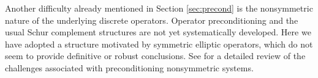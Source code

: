 \documentclass[11pt, reqno, a4paper, twoside]{article}
\numberwithin{equation}{section}
\numberwithin{remark}{section}
\numberwithin{figure}{section}
\numberwithin{table}{section}
\begin{document}
Another difficulty already mentioned in Section \ref{sec:precond} is the nonsymmetric nature of the underlying discrete operators. Operator preconditioning and the usual  Schur complement structures are not yet  systematically developed. Here we have adopted a structure motivated by symmetric elliptic operators, which do not seem to provide definitive or robust conclusions.
See \cite{wathen2015preconditioning} for a detailed review of the challenges associated with preconditioning nonsymmetric systems. 

\end{document}
